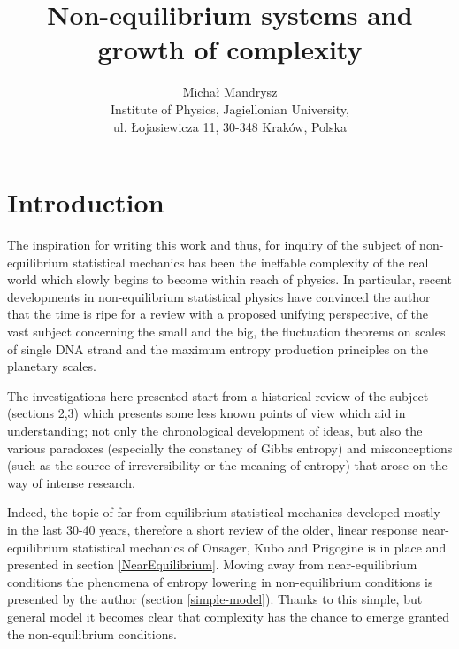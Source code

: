 \documentclass[a4paper,12pt]{article}
\begin{document}
\title{Non-equilibrium systems and growth of complexity}

\author{Michał Mandrysz \\
Institute of Physics, Jagiellonian University, \\ul. Łojasiewicza
11, 30-348 Kraków, Polska }

\maketitle

\tableofcontents

\newpage

\section{Introduction}

The inspiration for writing this work and thus, for inquiry of the subject of non-equilibrium statistical mechanics has been the ineffable complexity of the real world which slowly begins to become within reach of physics. 
In particular, recent developments in non-equilibrium statistical physics have convinced the author that the time is ripe for a review with a proposed unifying perspective, of the vast subject concerning the small and the big, the fluctuation theorems on scales of single DNA strand and the maximum entropy production principles on the planetary scales. 

The investigations here presented start from a historical review of the subject (sections 2,3) which presents some less known points of view which aid in understanding; not only the chronological development of ideas, but also the various paradoxes (especially the constancy of Gibbs entropy) and misconceptions (such as the source of irreversibility or the meaning of entropy) that arose on the way of intense research. 

Indeed, the topic of far from equilibrium statistical mechanics developed mostly in the last 30-40 years, therefore a short review of the older, linear response near-equilibrium statistical mechanics of Onsager, Kubo and Prigogine is in place and presented in section \ref{NearEquilibrium}. 
Moving away from near-equilibrium conditions the phenomena of entropy lowering in non-equilibrium conditions is presented by the author (section \ref{simple-model}). Thanks to this simple, but general model it becomes clear that complexity has the chance to emerge granted the non-equilibrium conditions.
\end{document}
